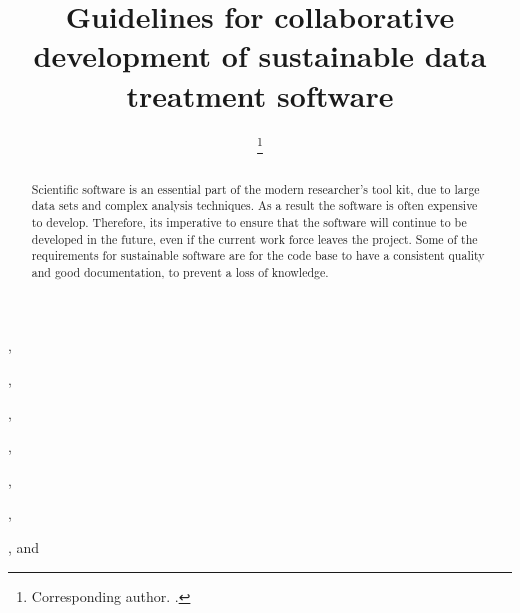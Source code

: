 \documentclass[jnr]{iosart2x}
\begin{document}
\begin{frontmatter}

\title{Guidelines for collaborative development of sustainable data treatment software}

\author[A]{ %
\thanks{Corresponding author. .}},
\author[A]{ },
\author[C]{ },
\author[D]{ },
\author[A]{ },
\author[E]{ },
\author[A]{ },
and
\author[B]{ }

\address[A]{,}
\address[B]{,}
\address[C]{,}
\address[D]{,}
\address[E]{,}

\begin{abstract}
Scientific software is an essential part of the modern researcher's tool kit, due to large data sets and complex analysis techniques.
As a result the software is often expensive to develop.
Therefore, its imperative to ensure that the software will continue to be developed in the future, even if the current work force leaves the project.
Some of the requirements for sustainable software are for the code base to have a consistent quality and good documentation, to prevent a loss of knowledge.



\end{abstract}
\end{frontmatter}
\end{document}

